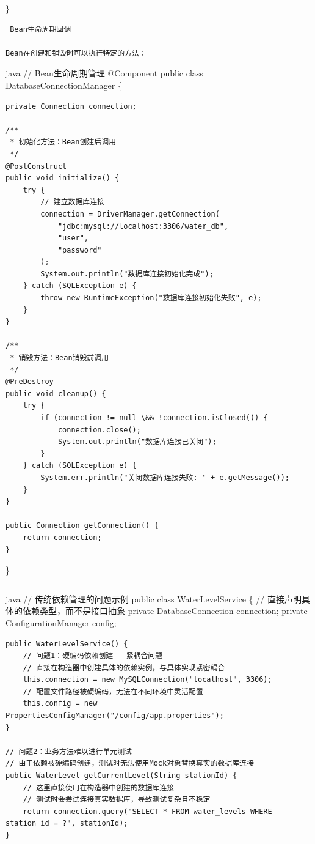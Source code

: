\}

\begin{lstlisting}
 Bean生命周期回调

Bean在创建和销毁时可以执行特定的方法：
\end{lstlisting}

java // Bean生命周期管理 @Component public class DatabaseConnectionManager \{

\begin{verbatim}
private Connection connection;

/**
 * 初始化方法：Bean创建后调用
 */
@PostConstruct
public void initialize() {
    try {
        // 建立数据库连接
        connection = DriverManager.getConnection(
            "jdbc:mysql://localhost:3306/water_db", 
            "user", 
            "password"
        );
        System.out.println("数据库连接初始化完成");
    } catch (SQLException e) {
        throw new RuntimeException("数据库连接初始化失败", e);
    }
}

/**
 * 销毁方法：Bean销毁前调用
 */
@PreDestroy
public void cleanup() {
    try {
        if (connection != null \&& !connection.isClosed()) {
            connection.close();
            System.out.println("数据库连接已关闭");
        }
    } catch (SQLException e) {
        System.err.println("关闭数据库连接失败: " + e.getMessage());
    }
}

public Connection getConnection() {
    return connection;
}
\end{verbatim}

\}

\begin{lstlisting}

\end{lstlisting}

java // 传统依赖管理的问题示例 public class WaterLevelService \{ // 直接声明具体的依赖类型，而不是接口抽象 private DatabaseConnection connection; private ConfigurationManager config;

\begin{verbatim}
public WaterLevelService() {
    // 问题1：硬编码依赖创建 - 紧耦合问题
    // 直接在构造器中创建具体的依赖实例，与具体实现紧密耦合
    this.connection = new MySQLConnection("localhost", 3306);
    // 配置文件路径被硬编码，无法在不同环境中灵活配置
    this.config = new PropertiesConfigManager("/config/app.properties");
}

// 问题2：业务方法难以进行单元测试
// 由于依赖被硬编码创建，测试时无法使用Mock对象替换真实的数据库连接
public WaterLevel getCurrentLevel(String stationId) {
    // 这里直接使用在构造器中创建的数据库连接
    // 测试时会尝试连接真实数据库，导致测试复杂且不稳定
    return connection.query("SELECT * FROM water_levels WHERE station_id = ?", stationId);
}
\end{verbatim}


